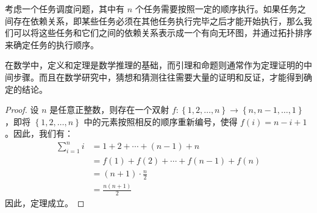 \begin{exmp}
    考虑一个任务调度问题，其中有 $n$ 个任务需要按照一定的顺序执行。如果任务之间存在依赖关系，即某些任务必须在其他任务执行完毕之后才能开始执行，那么我们可以将这些任务和它们之间的依赖关系表示成一个有向无环图，并通过拓扑排序来确定任务的执行顺序。
\end{exmp}

\begin{rem}
    在数学中，定义和定理是数学推理的基础，而引理和命题则通常作为定理证明的中间步骤。而且在数学研究中，猜想和猜测往往需要大量的证明和反证，才能得到确定的结论。
\end{rem}

\begin{proof}
    设 $n$ 是任意正整数，则存在一个双射 $f: \left\{1,2,\dots,n\right\} \rightarrow \left\{n,n-1,\dots,1\right\}$，即将 $\left\{1,2,\dots,n\right\}$ 中的元素按照相反的顺序重新编号，使得 $f(i) = n-i+1$。因此，我们有：
    \begin{align*}
        \sum_{i=1}^n i & = 1 + 2 + \cdots + (n-1) + n           \\
                       & = f(1) + f(2) + \cdots + f(n-1) + f(n) \\
                       & = (n+1) \cdot \frac{n}{2}              \\
                       & = \frac{n(n+1)}{2}
    \end{align*}
    因此，定理成立。
\end{proof}